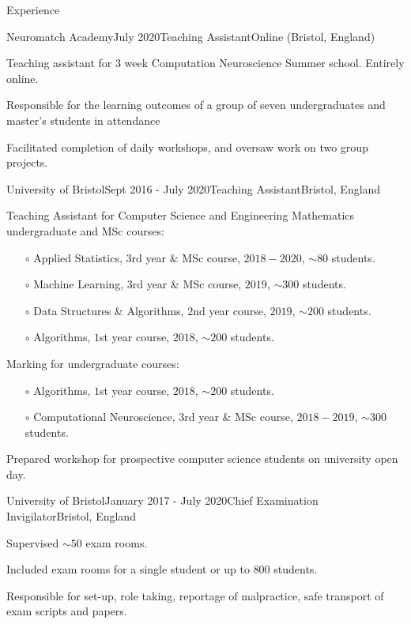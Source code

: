 \documentclass{resume} %
\begin{document}
\begin{rSection}{Experience}

  \begin{rSubsection}{Neuromatch Academy}{July 2020}{Teaching Assistant}{Online (Bristol, England)}
    \item Teaching assistant for 3 week Computation Neuroscience Summer school. Entirely online.
    \item Responsible for the learning outcomes of a group of seven undergraduates and master's students in attendance
    \item Facilitated completion of daily workshops, and oversaw work on two group projects.
  \end{rSubsection}

  \begin{rSubsection}{University of Bristol}{Sept 2016 - July 2020}{Teaching Assistant}{Bristol, England}
    \item Teaching Assistant for Computer Science and Engineering Mathematics undergraduate and MSc courses:
      \begin{itemize}
        \item[$\circ$] Applied Statistics, $3$rd year \&  MSc course, $2018 - 2020$, $\sim 80$ students.
        \item[$\circ$] Machine Learning, $3$rd year \& MSc course, $2019$, $\sim 300$ students.
        \item[$\circ$] Data Structures \& Algorithms, $2$nd year course, $2019$, $\sim 200$ students.
        \item[$\circ$] Algorithms, $1$st year course, $2018$, $\sim 200$ students.
      \end{itemize}\vspace{1.5mm}
    \item Marking for undergraduate courses:
      \begin{itemize}
        \item[$\circ$] Algorithms, $1$st year course, $2018$, $\sim 200$ students.
        \item[$\circ$] Computational Neuroscience, $3$rd year \& MSc course, $2018-2019$, $\sim 300$ students.
      \end{itemize}\vspace{1.5mm}
    \item Prepared workshop for prospective computer science students on university open day.
  \end{rSubsection}

  \begin{rSubsection}{University of Bristol}{January 2017 - July 2020}{Chief Examination Invigilator}{Bristol, England}
    \item Supervised $\sim 50$ exam rooms.
    \item Included exam rooms for a single student or up to $800$ students.
    \item Responsible for set-up, role taking, reportage of malpractice, safe transport of exam scripts and papers.
  \end{rSubsection}


\end{rSection}
\end{document}
